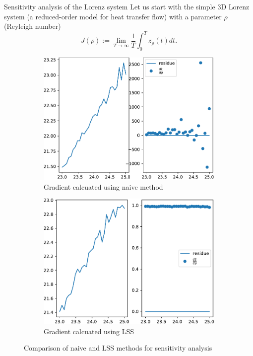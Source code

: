\documentclass[NUS-Kajima workshop]{beamer}
\begin{document}
\begin{frame}{Sensitivity analysis of the Lorenz system}
	Let us start with the simple 3D Lorenz system (a reduced-order model for heat transfer flow) with a parameter $\rho$ (Reyleigh number)
	\begin{equation}
		J(\rho) := \lim_{T\rightarrow \infty} \frac{1}{T}\int_0^T z_{\rho}(t)dt.
	\end{equation} 
	\begin{figure}[ht]
			\centering
			\begin{subfigure}{0.5\linewidth} %
				\centering
				\includegraphics[width=\linewidth]{fig/Lorenz1.pdf}
				\caption{Gradient calcuated using naive method}
			  \end{subfigure}%
			  \begin{subfigure}{0.5\linewidth} %
				\centering
				\includegraphics[width=\linewidth]{fig/Lorenz2.pdf}
				\caption{Gradient calcuated using LSS}
			  \end{subfigure}
			  \caption{Comparison of naive and LSS methods for sensitivity analysis}
	\end{figure}
\end{frame}
\end{document}
